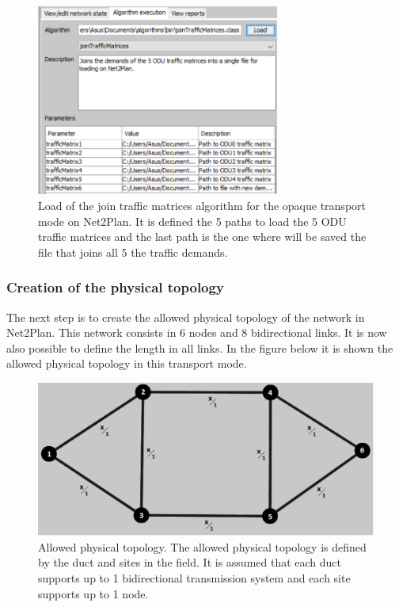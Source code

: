 \begin{figure}[H]
\centering
\includegraphics[width=8cm]{sdf/heuristic/opaque/figures/traffic_matrices}
\caption{Load of the join traffic matrices algorithm for the opaque transport mode on Net2Plan. It is defined the 5 paths to load the 5 ODU traffic matrices and the last path is the one where will be saved the file that joins all 5 the traffic demands.}
\label{traffic_matrices_surv_ref_opaque}
\end{figure}

\newpage
\subsubsection{Creation of the physical topology}

\vspace{11pt}
The next step is to create the allowed physical topology of the network in Net2Plan. This network consists in 6 nodes and 8 bidirectional links. It is now also possible to define the length in all links. In the figure below it is shown the allowed physical topology in this transport mode.

\begin{figure}[H]
\centering
\includegraphics[width=12cm]{sdf/heuristic/opaque/figures/allowed_physical}
\caption{Allowed physical topology. The allowed physical topology is defined by the duct and sites in the field. It is assumed that each duct supports up to 1 bidirectional transmission system and each site supports up to 1 node.}
\label{allowed_physical_surv_opaque}
\end{figure}

